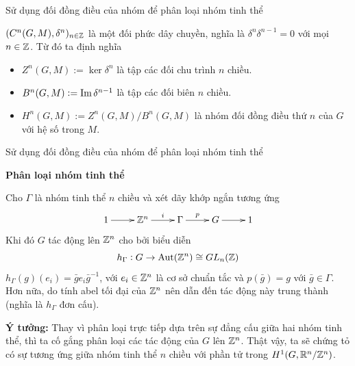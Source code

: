 \begin{frame}{Sử dụng đối đồng điều của nhóm để phân loại nhóm tinh thể}
    \begin{proposition}
        $(C^n(G,M), \delta^n)_{n \in \mathbb Z}$ là một đối phức dây chuyền, nghĩa là $\delta^{n} \delta^{n-1} = 0$ với mọi $n \in \mathbb Z$. Từ đó ta định nghĩa
        \begin{itemize}
            \item $Z^n(G,M) := \ker \delta^n$ là tập các \alert{đối chu trình $n$ chiều}.
            \item $B^n(G,M) := \operatorname{Im}\delta^{n-1}$ là tập các \alert{đối biên $n$ chiều}.
            \item $H^n(G,M) := Z^n(G,M) / B^n(G,M)$ là \alert{nhóm đối đồng điều thứ $n$} của $G$ với hệ số trong $M$.
        \end{itemize}
    \end{proposition}
\end{frame}

\begin{frame}{Sử dụng đối đồng điều của nhóm để phân loại nhóm tinh thể}
    \begin{center}
        \Large{\textbf{Phân loại nhóm tinh thể}}
    \end{center}
    Cho $\Gamma$ là nhóm tinh thể $n$ chiều và xét dãy khớp ngắn tương ứng
    \begin{equation}\label{eq:exact}
        \xymatrix{
            1 \ar[r] & \Z^n \ar[r]^-{i} & \Gamma \ar[r]^-{p} & G \ar[r] & 1
        }
    \end{equation}
    Khi đó $G$ tác động lên $\mathbb Z^n$ cho bởi biểu diễn 
    $$
        h_{\Gamma}: G \rightarrow \operatorname{Aut}(\mathbb Z^n) \cong GL_n(\mathbb Z)
    $$
    $h_{\Gamma}(g)(e_i) = \bar{g} e_i \bar{g}^{-1}$, với $e_i \in \mathbb Z^n$ là cơ sở chuẩn tắc và $p(\bar{g}) = g$ với $\bar{g} \in \Gamma$. Hơn nữa, do tính abel tối đại của $\mathbb Z^n$ nên dẫn đến tác động này trung thành (nghĩa là $h_{\Gamma}$ đơn cấu).

    \textbf{Ý tưởng:} Thay vì phân loại trực tiếp dựa trên sự đẳng cấu giữa hai nhóm tinh thể, thì ta cố gắng phân loại các tác động của $G$ lên $\mathbb Z^n$. Thật vậy, ta sẽ chứng tỏ có sự tương ứng giữa nhóm tinh thể $n$ chiều với phần tử trong $H^1(G, \mathbb R^n / \mathbb Z^n)$.
\end{frame}

